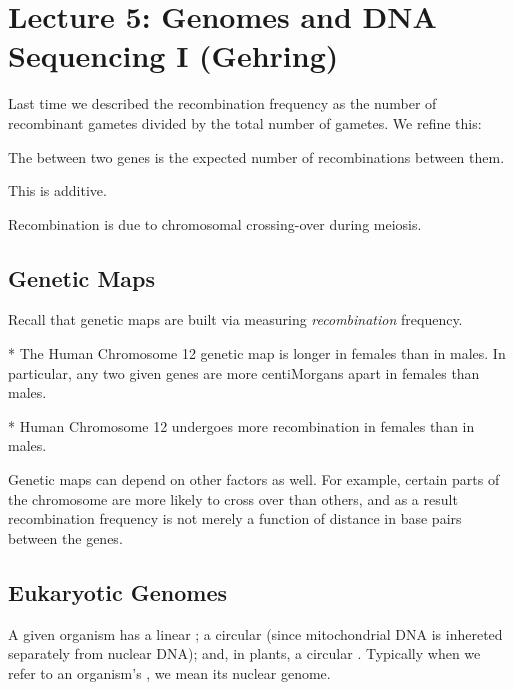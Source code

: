\section*{Lecture 5: Genomes and DNA Sequencing I (Gehring)}
\setcounter{section}{5}
\setcounter{subsection}{0}
\setcounter{defn}{0}
\setcounter{defncontainer}{0}

Last time we described the recombination frequency as the number of recombinant gametes divided by the total number of gametes. We refine this:

\begin{defn}
	The  between two genes is the expected number of recombinations between them.
\end{defn}

This is additive.

\begin{fact}
	Recombination is due to chromosomal crossing-over during meiosis.
\end{fact}

\subsection{Genetic Maps}

Recall that genetic maps are built via measuring \emph{recombination} frequency.

\begin{fact}*
	The Human Chromosome 12 genetic map is longer in females than in males. In particular, any two given genes are more centiMorgans apart in females than males.
\end{fact}

\begin{cor}*
	Human Chromosome 12 undergoes more recombination in females than in males.
\end{cor}

Genetic maps can depend on other factors as well. For example, certain parts of the chromosome are more likely to cross over than others, and as a result recombination frequency is not merely a function of distance in base pairs between the genes.

\subsection{Eukaryotic Genomes}

\begin{fact}
	A given organism has a linear ; a circular  (since mitochondrial DNA is inhereted separately from nuclear DNA); and, in plants, a circular .
	Typically when we refer to an organism's , we mean its nuclear genome.
\end{fact}

